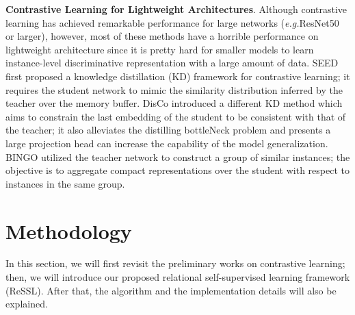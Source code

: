 \documentclass{article}
\newcommand{\<}{\left\langle}
\renewcommand{\>}{\right\rangle}
\newcommand{\eg}{{\emph{e.g.}}}
\begin{document}
\textbf{Contrastive Learning for Lightweight Architectures}. Although contrastive learning has achieved remarkable performance for large networks (\eg ResNet50 or larger), however, most of these methods have a horrible performance on lightweight architecture since it is pretty hard for smaller models to learn instance-level discriminative representation with a large amount of data. SEED \cite{seed} first proposed a knowledge distillation (KD) framework for contrastive learning; it requires the student network to mimic the similarity distribution inferred by the teacher over the memory buffer. DisCo \cite{disco} introduced a different KD method which aims to constrain the last embedding of the student to be consistent with that of the teacher; it also alleviates the distilling bottleNeck problem and presents a large projection head can increase the capability of the model generalization. BINGO \cite{bingo} utilized the teacher network to construct a group of similar instances; the objective is to aggregate compact representations over the student with respect
to instances in the same group.
 
\label{section:method}
\section{Methodology}

In this section, we will first revisit the preliminary works on contrastive learning; then, we will introduce our proposed relational self-supervised learning framework (ReSSL). After that, the algorithm and the implementation details will also be explained.
\end{document}
